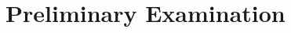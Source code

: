 \renewcommand{\sectionmark}[1]{\markboth{}{Preliminary Exam}}
\section[Preliminary Examination]{Preliminary Examination}
\addtocounter{section}{-1}
\normalsize{}
\renewcommand{\sectionmark}[1]{\markboth{}{Lecture \thesection: #1}}
\renewcommand{\leftmark}{February 14, 2024}

